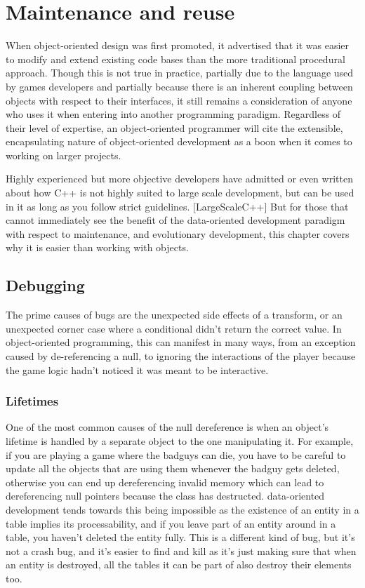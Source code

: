 \chapter{Maintenance and reuse}

When object-oriented design was first promoted, it advertised that it was
easier to modify and extend existing code bases than the more traditional
procedural approach. Though this is not true in practice, partially due to the
language used by games developers and partially because there is an inherent
coupling between objects with respect to their interfaces, it still remains a
consideration of anyone who uses it when entering into another programming
paradigm. Regardless of their level of expertise, an object-oriented programmer
will cite the extensible, encapsulating nature of object-oriented development
as a boon when it comes to working on larger projects.

Highly experienced but more objective developers have admitted or even written
about how C++ is not highly suited to large scale development, but can be used
in it as long as you follow strict guidelines. [LargeScaleC++] But for
those that cannot immediately see the benefit of the data-oriented development
paradigm with respect to maintenance, and evolutionary development, this
chapter covers why it is easier than working with objects.

\section{Debugging}

The prime causes of bugs are the unexpected side effects of a transform, or an
unexpected corner case where a conditional didn't return the correct value. In
object-oriented programming, this can manifest in many ways, from an exception
caused by de-referencing a null, to ignoring the interactions of the player
because the game logic hadn't noticed it was meant to be interactive.

\subsection{Lifetimes}

One of the most common causes of the null dereference is when an
object's lifetime is handled by a separate object to the one manipulating it.
For example, if you are playing a game where the badguys can die, you have to
be careful to update all the objects that are using them whenever the badguy
gets deleted, otherwise you can end up dereferencing invalid memory which can
lead to dereferencing null pointers because the class has destructed.
data-oriented development tends towards this being impossible as the existence
of an entity in a table implies its processability, and if you leave part of an
entity around in a table, you haven't deleted the entity fully. This is a
different kind of bug, but it's not a crash bug, and it's easier to find and
kill as it's just making sure that when an entity is destroyed, all the tables
it can be part of also destroy their elements too.


